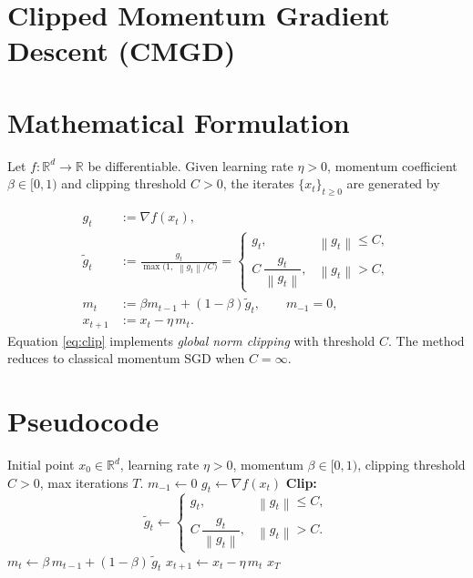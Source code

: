 \documentclass{article}
\newcommand{\norm}[1]{\left\lVert#1\right\rVert}
\newcommand{\grad}{\nabla}
\begin{document}
\section*{Clipped Momentum Gradient Descent (CMGD)}

\section*{Mathematical Formulation}
Let $f:\mathbb{R}^d\rightarrow\mathbb{R}$ be differentiable.  
Given learning rate $\eta>0$, momentum coefficient $\beta\in[0,1)$ and clipping threshold $C>0$, the iterates $\{x_t\}_{t\ge 0}$ are generated by  

\begin{align}
    g_t &:= \grad f(x_t), \label{eq:grad}\\[4pt]
    \tilde g_t &:= \frac{g_t}{\max\!\bigl(1,\; \norm{g_t}/C\bigr)} 
               = 
               \begin{cases}
                   g_t, & \norm{g_t}\le C,\\[2pt]
                   C\,\dfrac{g_t}{\norm{g_t}}, & \norm{g_t}> C,
               \end{cases}\label{eq:clip}\\[6pt]
    m_t &:= \beta m_{t-1} + (1-\beta)\tilde g_t,\qquad m_{-1}=0, \label{eq:momentum}\\[4pt]
    x_{t+1} &:= x_t - \eta\, m_t . \label{eq:update}
\end{align}
Equation \eqref{eq:clip} implements \emph{global norm clipping} with threshold $C$.  
The method reduces to classical momentum SGD when $C=\infty$.

\section*{Pseudocode}
\begin{algorithm}[H]
\caption{Clipped Momentum Gradient Descent}
\begin{algorithmic}[1]
\REQUIRE Initial point $x_0\in\mathbb{R}^d$, learning rate $\eta>0$, momentum $\beta\in[0,1)$, clipping threshold $C>0$, max iterations $T$.
\STATE $m_{-1}\leftarrow 0$
    \STATE $g_t \leftarrow \grad f(x_t)$
    \STATE \textbf{Clip:}
    \[
        \tilde g_t \leftarrow 
        \begin{cases}
            g_t, & \norm{g_t}\le C,\\
            C\,\dfrac{g_t}{\norm{g_t}}, & \norm{g_t}> C.
        \end{cases}
    \]
    \STATE $m_t \leftarrow \beta\, m_{t-1} + (1-\beta)\,\tilde g_t$
    \STATE $x_{t+1} \leftarrow x_t - \eta\, m_t$
\ENDFOR
\RETURN $x_T$
\end{algorithmic}
\end{algorithm}
\end{document}
